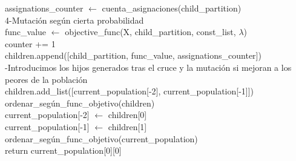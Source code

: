 \documentclass[11pt,a4paper]{article}
\begin{document}
\begin{algorithm}[H]
{{{                        assignations\_counter $\leftarrow$ cuenta\_asignaciones(child\_partition) \\
                        4-Mutación según cierta probabilidad \\
                        func\_value $\leftarrow$ objective\_func(X, child\_partition, const\_list, $\lambda$) \\
                        counter += 1 \\
                        children.append([child\_partition, func\_value, assignations\_counter]) \\
                }
                -Introducimos los hijos generados tras el cruce y la mutación si mejoran a los peores de la población\\
                children.add\_list([current\_population[-2], current\_population[-1]]) \\
                ordenar\_según\_func\_objetivo(children) \\
                current\_population[-2] $\leftarrow$ children[0] \\
                current\_population[-1] $\leftarrow$ children[1] \\
                ordenar\_según\_func\_objetivo(current\_population) \\
            }
            return current\_population[0][0]  \\
        }
	\end{algorithm} 
	
\end{document}
